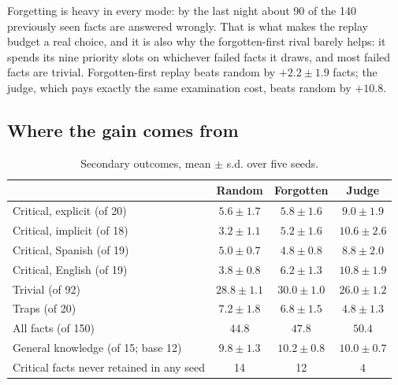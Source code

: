 \documentclass[11pt,a4paper]{article}
\begin{document}
Forgetting is heavy in every mode: by the last night about 90 of the 140 previously seen facts are answered wrongly.
That is what makes the replay budget a real choice, and it is also why the forgotten-first rival barely helps: it spends its nine priority slots on whichever failed facts it draws, and most failed facts are trivial.
Forgotten-first replay beats random by $+2.2{\pm}1.9$ facts; the judge, which pays exactly the same examination cost, beats random by $+10.8$.

\subsection{Where the gain comes from}
\label{sec:breakdown}

\begin{table}[htbp]
\centering
\small
\begin{tabular}{lccc}
\toprule
 & Random & Forgotten & Judge\\
\midrule
Critical, explicit (of 20) & $5.6{\pm}1.7$ & $5.8{\pm}1.6$ & $9.0{\pm}1.9$\\
Critical, implicit (of 18) & $3.2{\pm}1.1$ & $5.2{\pm}1.6$ & $10.6{\pm}2.6$\\
Critical, Spanish (of 19) & $5.0{\pm}0.7$ & $4.8{\pm}0.8$ & $8.8{\pm}2.0$\\
Critical, English (of 19) & $3.8{\pm}0.8$ & $6.2{\pm}1.3$ & $10.8{\pm}1.9$\\
\midrule
Trivial (of 92) & $28.8{\pm}1.1$ & $30.0{\pm}1.0$ & $26.0{\pm}1.2$\\
Traps (of 20) & $7.2{\pm}1.8$ & $6.8{\pm}1.5$ & $4.8{\pm}1.3$\\
All facts (of 150) & $44.8$ & $47.8$ & $50.4$\\
General knowledge (of 15; base 12) & $9.8{\pm}1.3$ & $10.2{\pm}0.8$ & $10.0{\pm}0.7$\\
\midrule
Critical facts never retained in any seed & 14 & 12 & 4\\
\bottomrule
\end{tabular}
\caption{Secondary outcomes, mean $\pm$ s.d. over five seeds.}
\label{tab:breakdown}
\end{table}
\end{document}

